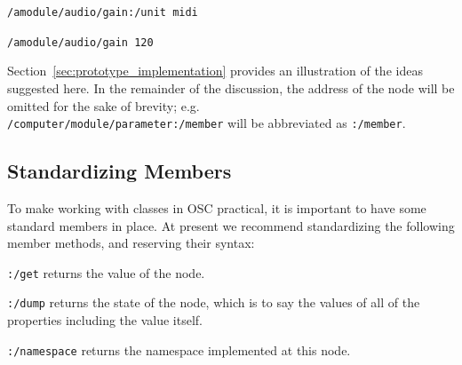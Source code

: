 \documentclass{NIME-alternate}
\newenvironment{packed_item}{
\begin{itemize}
  \setlength{\itemsep}{1pt}
  \setlength{\parskip}{0pt}
  \setlength{\parsep}{0pt}
}{\end{itemize}}
\begin{document}
\begin{Abstract}
\texttt{/amodule/audio/gain:/unit midi}

\texttt{/amodule/audio/gain 120}




Section~\ref{sec:prototype_implementation} provides an illustration of the ideas suggested here. In the remainder of the discussion, the address of the node will be omitted for the sake of brevity; e.g.\\ 
\texttt{/computer/module/parameter:/member}  
will be abbreviated as \texttt{:/member}.



\subsection{Standardizing Members}

To make working with classes in OSC practical, it is important to have some standard members in place. At present we recommend standardizing the following member methods, and reserving their syntax:
\begin{packed_item}%
	\item \texttt{:/get} returns the value of the node.
	\item \texttt{:/dump} returns the state of the node, which is to say the values of all of the properties including the value itself.
	\item \texttt{:/namespace} returns the namespace implemented at this node.
\end{packed_item}%






\end{Abstract}
\end{document}
